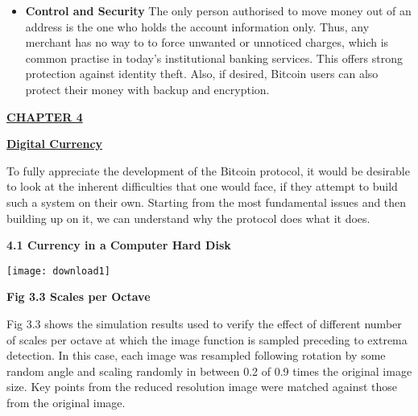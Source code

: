 \documentclass[12pt,a4paper]{report}
\begin{document}
\begin{flushleft}
\begin{itemize}
  \vspace{10mm}
  
  \item \textbf{Control and Security} \newline 
  The only person authorised to move money out of an address is the one who holds the account information only. Thus, any merchant has no way to to force unwanted or unnoticed charges, which is common practise in today's institutional banking services. This offers strong protection against identity theft. Also, if desired, Bitcoin users can also protect their money with backup and encryption.
  

\end{itemize}


\newpage

\begin{center}\underline{  \Large\textbf{CHAPTER 4}}\end{center}
\begin{center}\underline{ \Large \textbf{Digital Currency}}\end{center}

\vspace{10mm}

To fully appreciate the development of the Bitcoin protocol, it would be desirable to look at the inherent difficulties that one would face, if they attempt to build such a system on their own. Starting from the most fundamental issues and then building up on it, we can understand why the protocol does what it does.
\vspace{10mm}

\textbf{4.1 Currency in a Computer Hard Disk}

\begin{center}\texttt{[image: download1]}\end{center}
\begin{center}\textbf{Fig 3.3 Scales per Octave}\end{center}
\vspace{10mm}

Fig 3.3 shows the simulation results used to verify the effect of different   number of scales per octave at which the image function is sampled preceding to extrema detection. In this case, each image was resampled following rotation by some random angle and scaling randomly  in  between 0.2 of 0.9 times the original image size. Key points from the reduced resolution image were matched against those from the original image.\par


\end{flushleft}
\end{document}
